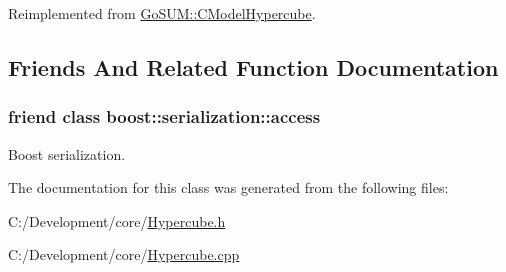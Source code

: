 Reimplemented from \hyperlink{class_go_s_u_m_1_1_c_model_hypercube_a67de6632c6f6ca3685d2a750599974c6}{Go\-S\-U\-M\-::\-C\-Model\-Hypercube}.



\subsection{Friends And Related Function Documentation}
\hypertarget{class_go_s_u_m_1_1_c_monte_carlo_h_c_ac98d07dd8f7b70e16ccb9a01abf56b9c}{
\subsubsection[{boost\-::serialization\-::access}]{\setlength{\rightskip}{0pt plus 5cm}friend class boost\-::serialization\-::access\hspace{0.3cm}{\ttfamily [friend]}}}\label{class_go_s_u_m_1_1_c_monte_carlo_h_c_ac98d07dd8f7b70e16ccb9a01abf56b9c}


Boost serialization. 



The documentation for this class was generated from the following files\-:\begin{DoxyCompactItemize}
\item 
C\-:/\-Development/core/\hyperlink{_hypercube_8h}{Hypercube.\-h}\item 
C\-:/\-Development/core/\hyperlink{_hypercube_8cpp}{Hypercube.\-cpp}\end{DoxyCompactItemize}

